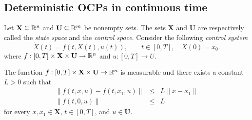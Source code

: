 \subsection{Deterministic OCPs in continuous time}

Let $\mathbf{X}\subseteq\mathbb{R}^n$ and $\mathbf{U}\subseteq \mathbb{R}^m$ be nonempty sets. The sets $\mathbf{X}$ and $\mathbf{U}$ are 
respectively called the {\it state space} and the {\it control space}. Consider 
the following {\it control system}
\begin{equation}\label{CoDiffEq}
\dot{X}(t)=f(t,X(t),u(t)),\qquad t\in[0,T], \quad X(0)=x_0.
\end{equation}
where $f:[0,T]\times \mathbf{X}\times \mathbf{U}\to \mathbb{R}^n$ and $u:[0,T]\to U$. 

\begin{assumption}\label{Assum1}  The function $f:[0,T]\times \mathbf{X}\times \mathbf{U}\to \mathbb{R}^n$
is measurable and there exists a constant $L>0$ such that
\begin{eqnarray}
  \|f(t,x,u)-f(t,x_1,u)\| & \leq & L\|x-x_1\|\label{LipfInx}\\
  \|f(t,0,u)\| & \leq & L\label{fBound}
\end{eqnarray}
for every $x,x_1\in \mathbf{X}$, $t\in[0,T]$, and $u\in \mathbf{U}$.
\end{assumption}


